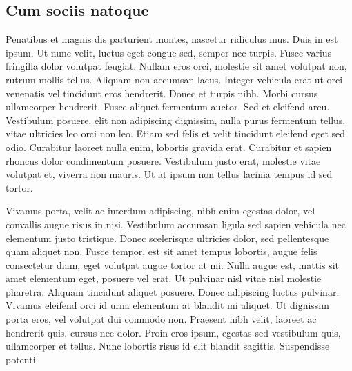 \subsection{Cum sociis natoque}
Penatibus et magnis dis parturient montes, nascetur ridiculus mus. Duis in est ipsum. Ut nunc velit, luctus eget congue sed, semper nec turpis. Fusce varius fringilla dolor volutpat feugiat. Nullam eros orci, molestie sit amet volutpat non, rutrum mollis tellus. Aliquam non accumsan lacus. Integer vehicula erat ut orci venenatis vel tincidunt eros hendrerit. Donec et turpis nibh. Morbi cursus ullamcorper hendrerit. Fusce aliquet fermentum auctor. Sed et eleifend arcu. Vestibulum posuere, elit non adipiscing dignissim, nulla purus fermentum tellus, vitae ultricies leo orci non leo. Etiam sed felis et velit tincidunt eleifend eget sed odio. Curabitur laoreet nulla enim, lobortis gravida erat. Curabitur et sapien rhoncus dolor condimentum posuere. Vestibulum justo erat, molestie vitae volutpat et, viverra non mauris. Ut at ipsum non tellus lacinia tempus id sed tortor.

Vivamus porta, velit ac interdum adipiscing, nibh enim egestas dolor, vel convallis augue risus in nisi. Vestibulum accumsan ligula sed sapien vehicula nec elementum justo tristique. Donec scelerisque ultricies dolor, sed pellentesque quam aliquet non. Fusce tempor, est sit amet tempus lobortis, augue felis consectetur diam, eget volutpat augue tortor at mi. Nulla augue est, mattis sit amet elementum eget, posuere vel erat. Ut pulvinar nisl vitae nisl molestie pharetra. Aliquam tincidunt aliquet posuere. Donec adipiscing luctus pulvinar. Vivamus eleifend orci id urna elementum at blandit mi aliquet. Ut dignissim porta eros, vel volutpat dui commodo non. Praesent nibh velit, laoreet ac hendrerit quis, cursus nec dolor. Proin eros ipsum, egestas sed vestibulum quis, ullamcorper et tellus. Nunc lobortis risus id elit blandit sagittis. Suspendisse potenti.

